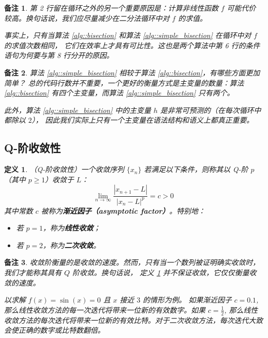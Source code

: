 \documentclass[a4paper]{ctexart}
\newtheorem{remark}{备注}
\newtheorem{definition}[theorem]{定义} %
\numberwithin{theorem}{section}
\numberwithin{equation}{section}
\numberwithin{figure}{section}
\numberwithin{remark}{section}
\begin{document}
\begin{remark}
    \label{rem::reduce_cost}
第 2 行留在循环之外的另一个重要原因是：计算非线性函数 \(f\) 可能代价较高。换句话说，我们应尽量减少在二分法循环中对 \(f\) 的求值。

事实上，只有当算法 \ref{alg::bisection} 和算法 \ref{alg::simple_bisection} 在循环中对 \(f\) 的求值次数相同，
它们在效率上才具有可比性。这也是两个算法中第 6 行的条件语句为何要与第 8 行分开的原因。
\end{remark}

\begin{remark}
算法 \ref{alg::simple_bisection} 相较于算法 \ref{alg::bisection}，有哪些方面更加简单？
总的代码行数并不重要，一个更好的衡量方式是主变量的数量：算法 \ref{alg::bisection} 有四个主变量，而算法 \ref{alg::simple_bisection} 只有两个。

此外，算法 \ref{alg::simple_bisection} 中的主变量 \(h\) 是非常可预测的（在每次循环中都除以 $2$），
因此我们实际上只有一个主变量在语法结构和语义上都真正重要。
\end{remark}


\subsection{Q-阶收敛性}
\label{subsec::Q_convergence}

\begin{definition}
    \label{def::Q_convergence}
（Q-阶收敛性）一个收敛序列 \(\{x_n\}\) 若满足以下条件，则称其以 Q-阶 \(p\)（其中 \(p \ge 1\)）收敛于 \(L\)：
\begin{equation}
\lim_{n \to \infty} \frac{|x_{n+1} - L|}{|x_n - L|^p} = c > 0
\end{equation}
其中常数 \(c\) 被称为\textbf{渐近因子（asymptotic factor）}。特别地：
\begin{itemize}
    \item 若 \(p = 1\)，称为\textbf{线性收敛}；
    \item 若 \(p = 2\)，称为\textbf{二次收敛}。
\end{itemize}    
\end{definition}

\begin{remark}
收敛阶衡量的是收敛的速度。然而，只有当一个数列被证明确实收敛时，我们才能称其具有 $Q$ 阶收敛。换句话说，
定义 \ref{def::Q_convergence} 并不保证收敛，它仅仅衡量收敛的速度。

以求解 \( f(x) = \sin(x) = 0 \) 且 \( x \) 接近 $3$ 的情形为例。
如果渐近因子 \( c = 0.1 \), 那么线性收敛方法的每一次迭代将带来一位新的有效数字。如果 \( c = \frac{1}{2} \),
那么线性收敛方法的每次迭代将带来一位新的有效比特。对于二次收敛方法，每次迭代大致会使正确的数字或比特数翻倍。
\end{remark}
\end{document}
